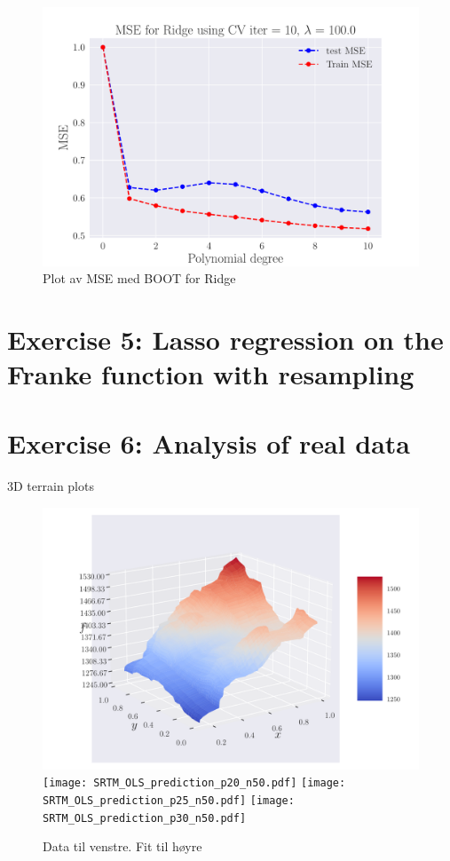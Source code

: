 \documentclass[reprint,english,notitlepage,aps,nobalancelastpage,nofootinbib]{revtex4-1}  %
\begin{document}
\begin{figure}[H]
	\endminipage\hfill
	\includegraphics[width=\linewidth]{MSE_Ridge_n30_eps02_pol10_CV_re10_lam_100_0.pdf}
	\endminipage
	\caption{Plot av MSE med BOOT for Ridge} \label{fig:Ridge_CV}
\end{figure}


\section*{Exercise 5: Lasso regression on the Franke function with resampling}


\section*{Exercise 6: Analysis of real data}

3D terrain plots
\begin{figure}[H]
	\includegraphics[width=\linewidth]{SRTM_rawdata_n50.pdf}
	\endminipage\hfill
	\texttt{[image: SRTM\_OLS\_prediction\_p20\_n50.pdf]}
	\endminipage
	\texttt{[image: SRTM\_OLS\_prediction\_p25\_n50.pdf]}
	\endminipage\hfill
	\texttt{[image: SRTM\_OLS\_prediction\_p30\_n50.pdf]}
	\endminipage
	\caption{Data til venstre. Fit til høyre}
  \label{fig:terrain_raw_fit}
\end{figure}
\end{document}
